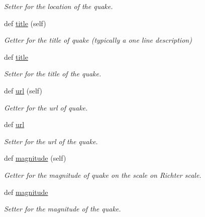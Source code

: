 \begin{DoxyCompactItemize}
\begin{DoxyCompactList}\small\item\em Setter for the location of the quake. \end{DoxyCompactList}\item 
def \mbox{\hyperlink{classbridges_1_1data__src__dependent_1_1earthquake__usgs_1_1_earthquake_u_s_g_s_a7b46d73e199b4cf4f9b1253f89727abe}{title}} (self)
\begin{DoxyCompactList}\small\item\em Getter for the title of quake (typically a one line description) \end{DoxyCompactList}\item 
def \mbox{\hyperlink{classbridges_1_1data__src__dependent_1_1earthquake__usgs_1_1_earthquake_u_s_g_s_a8aa7ec15933f9416f84367a38a192575}{title}}
\begin{DoxyCompactList}\small\item\em Setter for the title of the quake. \end{DoxyCompactList}\item 
def \mbox{\hyperlink{classbridges_1_1data__src__dependent_1_1earthquake__usgs_1_1_earthquake_u_s_g_s_a449a372a14b288f7fd71066fb3886cd1}{url}} (self)
\begin{DoxyCompactList}\small\item\em Getter for the url of quake. \end{DoxyCompactList}\item 
def \mbox{\hyperlink{classbridges_1_1data__src__dependent_1_1earthquake__usgs_1_1_earthquake_u_s_g_s_afc4af59842186d2f0198b3e6d0690a95}{url}}
\begin{DoxyCompactList}\small\item\em Setter for the url of the quake. \end{DoxyCompactList}\item 
def \mbox{\hyperlink{classbridges_1_1data__src__dependent_1_1earthquake__usgs_1_1_earthquake_u_s_g_s_a2ada4ba221f09e4fd249ba53f5647d61}{magnitude}} (self)
\begin{DoxyCompactList}\small\item\em Getter for the magnitude of quake on the scale on Richter scale. \end{DoxyCompactList}\item 
def \mbox{\hyperlink{classbridges_1_1data__src__dependent_1_1earthquake__usgs_1_1_earthquake_u_s_g_s_a103f7a3eee708e299c73d79843fd2187}{magnitude}}
\begin{DoxyCompactList}\small\item\em Setter for the magnitude of the quake. \end{DoxyCompactList}\end{DoxyCompactItemize}
